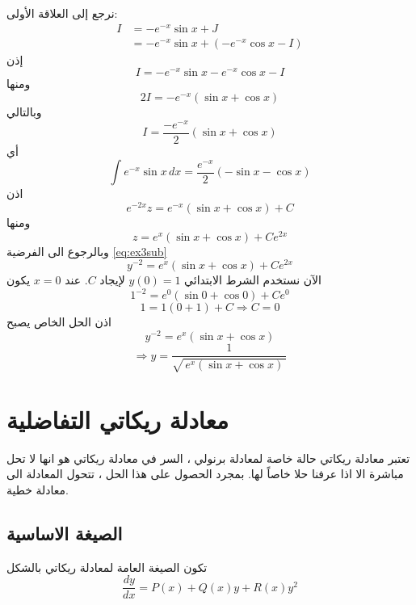 \begin{solution}
	نرجع إلى العلاقة الأولى:
	\begin{align*}
	I &= -e^{-x}\sin x + J \\
	&= -e^{-x}\sin x + (-e^{-x}\cos x - I)
	\end{align*}
	إذن
	\[
	I = -e^{-x}\sin x - e^{-x}\cos x - I
	\]
	ومنها
	\[
	2I = -e^{-x}(\sin x + \cos x)
	\]
	وبالتالي
	\[
	I = \frac{-e^{-x}}{2}(\sin x + \cos x)
	\]
	أي
	\[
	\int e^{-x}\sin x \, dx
	= \frac{e^{-x}}{2}(-\sin x - \cos x)
	\]
	اذن
	\[
	e^{-2x} z
	= e^{-x}(\sin x + \cos x) + C
	\]
	ومنها
	\[
	z = e^{x}(\sin x + \cos x) + C e^{2x}
	\]
	وبالرجوع الى الفرضية \eqref{eq:ex3sub}
	\[
	y^{-2} = e^{x}(\sin x + \cos x) + C e^{2x}
	\]
	الآن نستخدم الشرط الابتدائي $y(0)=1$ لإيجاد $C$.
	عند $x=0$ يكون
	\[
	1^{-2} = e^{0}(\sin 0 + \cos 0) + C e^{0}
	\]
	\[
	1 = 1(0 + 1) + C \Rightarrow C = 0
	\]
	اذن الحل الخاص يصبح
	\[
	y^{-2} = e^{x}(\sin x + \cos x)
	\]
	\[
	\Rightarrow y = \frac{1}{\sqrt{\,e^{x}(\sin x + \cos x)\,}}
	\]
\end{solution}
\setcounter{equation}{0}
\section{معادلة ريكاتي التفاضلية }
تعتبر معادلة ريكاتي حالة خاصة لمعادلة برنولي ، السر في معادلة ريكاتي هو انها لا تحل مباشرة الا اذا عرفنا حلا خاصاً لها. بمجرد الحصول على هذا الحل ، تتحول المعادلة الى معادلة خطية.

\subsection*{الصيغة الاساسية}
تكون الصيغة العامة لمعادلة ريكاتي بالشكل 
\begin{equation}
	\label{eq:recatti}
	\frac{dy}{dx} = P(x) + Q(x) y + R(x) y^2
\end{equation}

